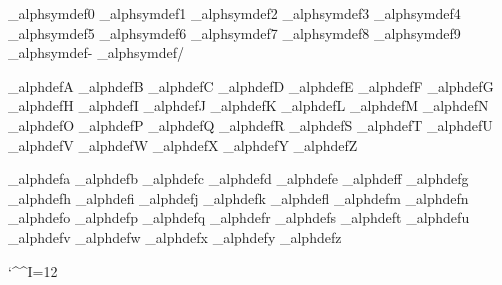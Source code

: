 \brl@mecab_alphsymdef{0}%
\brl@mecab_alphsymdef{1}
\brl@mecab_alphsymdef{2}
\brl@mecab_alphsymdef{3}
\brl@mecab_alphsymdef{4}
\brl@mecab_alphsymdef{5}
\brl@mecab_alphsymdef{6}
\brl@mecab_alphsymdef{7}
\brl@mecab_alphsymdef{8}
\brl@mecab_alphsymdef{9}
\brl@mecab_alphsymdef{-}%
\brl@mecab_alphsymdef{/}%


%


\brl@mecab_alphdef{A}
\brl@mecab_alphdef{B}
\brl@mecab_alphdef{C}
\brl@mecab_alphdef{D}
\brl@mecab_alphdef{E}
\brl@mecab_alphdef{F}
\brl@mecab_alphdef{G}
\brl@mecab_alphdef{H}
\brl@mecab_alphdef{I}
\brl@mecab_alphdef{J}
\brl@mecab_alphdef{K}
\brl@mecab_alphdef{L}
\brl@mecab_alphdef{M}
\brl@mecab_alphdef{N}
\brl@mecab_alphdef{O}
\brl@mecab_alphdef{P}
\brl@mecab_alphdef{Q}
\brl@mecab_alphdef{R}
\brl@mecab_alphdef{S}
\brl@mecab_alphdef{T}
\brl@mecab_alphdef{U}
\brl@mecab_alphdef{V}
\brl@mecab_alphdef{W}
\brl@mecab_alphdef{X}
\brl@mecab_alphdef{Y}
\brl@mecab_alphdef{Z}

\brl@mecab_alphdef{a}
\brl@mecab_alphdef{b}
\brl@mecab_alphdef{c}
\brl@mecab_alphdef{d}
\brl@mecab_alphdef{e}
\brl@mecab_alphdef{f}
\brl@mecab_alphdef{g}
\brl@mecab_alphdef{h}
\brl@mecab_alphdef{i}
\brl@mecab_alphdef{j}
\brl@mecab_alphdef{k}
\brl@mecab_alphdef{l}
\brl@mecab_alphdef{m}
\brl@mecab_alphdef{n}
\brl@mecab_alphdef{o}
\brl@mecab_alphdef{p}
\brl@mecab_alphdef{q}
\brl@mecab_alphdef{r}
\brl@mecab_alphdef{s}
\brl@mecab_alphdef{t}
\brl@mecab_alphdef{u}
\brl@mecab_alphdef{v}
\brl@mecab_alphdef{w}
\brl@mecab_alphdef{x}
\brl@mecab_alphdef{y}
\brl@mecab_alphdef{z}





\ifbrl@option@file%
\newwrite\brl@mecab@sourcefile%
\newread\brl@mecab@resultfile%

\def\brl@mecab@cmd_cr{^^J}
\ifbrl@option@oswin%
  \def\brl@mecab@cmd_tab{^^I}
\else%
  {\catcode`\^^I=12\relax%
    \gdef\brl@mecab@cmd_tab{^^I}%
  }
\fi%

\def\brl@mecab_exec{%
  \immediate\openout\brl@mecab@sourcefile=\jobname.mcb\relax%
  \immediate\write\brl@mecab@sourcefile{\brl@mecab@text%
    EOS%
  }%
  \immediate\closeout\brl@mecab@sourcefile%
  \brl@option@exec{\brl@mecab@translator}%
  {%
    \catcode`\^\active%
    \catcode`\ \active%
    \catcode`\<\active%
    \catcode`\>\active%
    \makeatletter%
    \endlinechar\m@ne%
    \@@input{\jobname.mrt}%
  }%
}%

